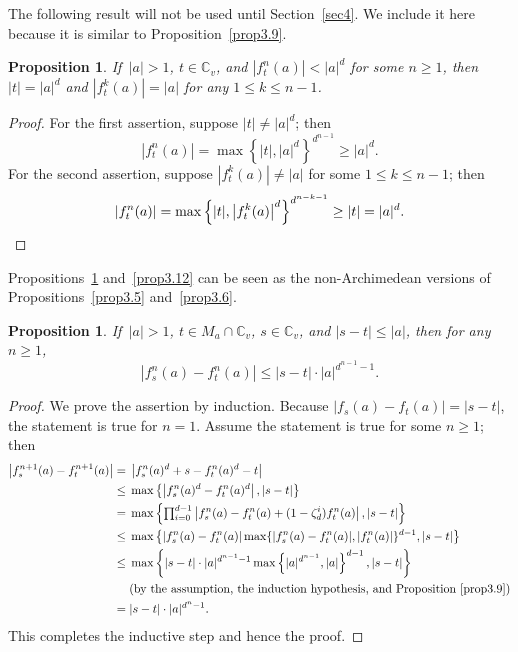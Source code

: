 \documentclass[10pt,a4paper]{amsart}
\numberwithin{equation}{section}
\theoremstyle{plain}
\newtheorem{prop}[thm]{Proposition}
\theoremstyle{definition}
\theoremstyle{remark}
\newcommand{\C}{\mathbb C}
\begin{document}
The following result will not be used until Section~\ref{sec4}. We
include it here because it is similar to Proposition~\ref{prop3.9}.

\begin{prop}\label{prop3.10}
If\, $|a|>1$, $t\in\C_{v}$, and $|f_{t}^{n}(a)|<|a|^{d}$
for some $n\geq1$, then $|t|=|a|^{d}$ and $|f_{t}^{k}(a)|=|a|$
for any $1\leq k\leq n-1$.
\end{prop}

\begin{proof}
For the first assertion, suppose $|t|\neq|a|^{d}$; then
\[
|f_{t}^{n}(a)|=\max\left\{|t|,|a|^{d}\right\}^{d^{n-1}}\geq|a|^{d}.
\]
For the second assertion, suppose $|f_{t}^{k}(a)|\neq|a|$ for some
$1\leq k\leq n-1$; then
\[
|f_{t}^{n}(a)|=\max\left\{|t|,\left|f_{t}^{k}(a)\right|^{d}\right\}^{d^{n-k-1}}\geq|t|=|a|^{d}.\qedhere
\]
\end{proof}

Propositions~\ref{prop3.11} and~\ref{prop3.12} can be seen as the
non-Archimedean versions of Propositions~\ref{prop3.5} and~\ref{prop3.6}.

\begin{prop}\label{prop3.11}
If\, $|a|>1$, $t\in M_{a}\cap\C_{v}$, $s\in\C_{v}$, and $|s-t|\leq|a|$, then 
for any $n\geq1$, 
\[
|f_{s}^{n}(a)-f_{t}^{n}(a)|\leq|s-t|\cdot|a|^{d^{n-1}-1}. 
\]
\end{prop}

\begin{proof}
We prove the assertion by induction. Because $|f_{s}(a)-f_{t}(a)|=|s-t|$,
the statement is true for $n=1$. Assume the statement is true for
some $n\geq1$; then
\allowdisplaybreaks
\begin{align*}
 \left|f_{s}^{n+1}(a)-f_{t}^{n+1}(a)\right|
=\; & \left|f_{s}^{n}(a)^{d}+s-f_{t}^{n}(a)^{d}-t\right|\\
\leq\; & \max\left\{\left|f_{s}^{n}(a)^{d}-f_{t}^{n}(a)^{d}\right|,|s-t|\right\}\\
=\; & \max\left\{{\textstyle \prod_{i=0}^{d-1}}\left|f_{s}^{n}(a)-f_{t}^{n}(a)+(1-\zeta_{d}^{i})f_{t}^{n}(a)\right|,|s-t|\right\}\\
\leq\; & \max\left\{|f_{s}^{n}(a)-f_{t}^{n}(a)|\max\{|f_{s}^{n}(a)-f_{t}^{n}(a)|,|f_{t}^{n}(a)|\}^{d-1},|s-t|\right\}\\
\leq\; & \max\left\{|s-t|\cdot|a|^{d^{n-1}-1}\max\left\{|a|^{d^{n-1}},|a|\right\}^{d-1},|s-t|\right\}\\
 & \text{(by the assumption, the induction hypothesis, and Proposition~\ref{prop3.9})}\\
=\; & |s-t|\cdot|a|^{d^{n}-1}.
\end{align*}
This completes the inductive step and hence the proof.
\end{proof}
\end{document}
